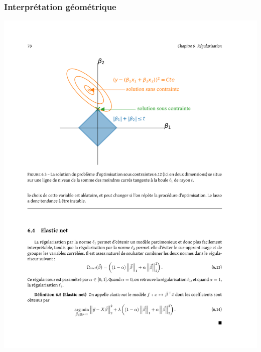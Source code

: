 \begin{frame}
  \frametitle{Interprétation géométrique}
  \begin{center}
    \includegraphics[width=.7\textwidth]{figures/l1reg_geom}  
  \end{center}
\end{frame}


